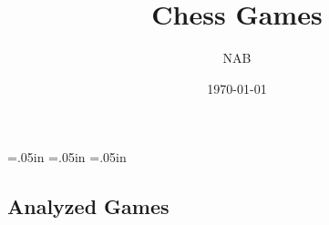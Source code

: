 \documentclass[a4paper,12pt,twoside]{article}
\begin{document}
 \topmargin=.05in
 \leftmargin=.05in
 \rightmargin=.05in
 \title{Chess Games}
 \author{NAB}
 \date{\today}
 \maketitle{}

\begin{multicols}{3}

\section{Analyzed Games}

\end{multicols}



\end{document}
